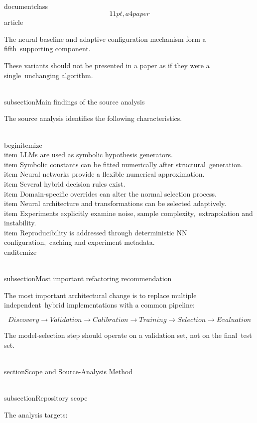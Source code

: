 \\documentclass\[11pt,a4paper\]{article}
\begin{document}
 The neural baseline and adaptive configuration mechanism form a fifth\
 supporting component.

 These variants should not be presented in a paper as if they were a single\
 unchanging algorithm.

 \\subsection{Main findings of the source analysis}

 The source analysis identifies the following characteristics.

 \\begin{itemize}\
 \\item LLMs are used as symbolic hypothesis generators.\
 \\item Symbolic constants can be fitted numerically after structural\
 generation.\
 \\item Neural networks provide a flexible numerical approximation.\
 \\item Several hybrid decision rules exist.\
 \\item Domain-specific overrides can alter the normal selection process.\
 \\item Neural architecture and transformations can be selected adaptively.\
 \\item Experiments explicitly examine noise, sample complexity,\
 extrapolation and instability.\
 \\item Reproducibility is addressed through deterministic NN configuration,\
 caching and experiment metadata.\
 \\end{itemize}

 \\subsection{Most important refactoring recommendation}

 The most important architectural change is to replace multiple independent\
 hybrid implementations with a common pipeline:

 $$
\boxed{
Discovery
\rightarrow
Validation
\rightarrow
Calibration
\rightarrow
Training
\rightarrow
Selection
\rightarrow
Evaluation
}
$$

 The model-selection step should operate on a validation set, not on the final\
 test set.

 \\section{Scope and Source-Analysis Method}\

 \\subsection{Repository scope}

 The analysis targets:
\end{document}
